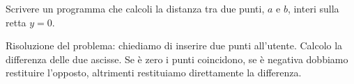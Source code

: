\begin{Exercise}[label={ex:distanza}]
  Scrivere un programma che calcoli la distanza tra due punti, $a$ e $b$, interi sulla retta $y = 0$.

  \begin{center}
  \end{center}

\end{Exercise}

\begin{Answer}[ref={ex:distanza}]
	Risoluzione del problema: chiediamo di inserire due punti all'utente. Calcolo la differenza delle due ascisse. Se \`e zero i punti coincidono, se \`e negativa dobbiamo restituire l'opposto, altrimenti restituiamo direttamente la differenza.

  

\end{Answer}